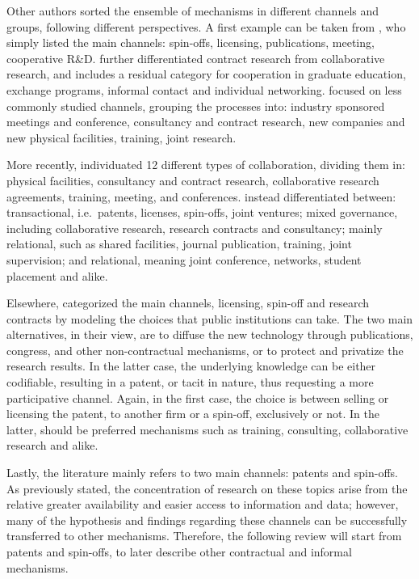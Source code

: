 Other authors sorted the ensemble of mechanisms in different channels and groups, following different perspectives. A first example can be taken from 	\citet{Rogers2001}, who simply listed the main channels: spin-offs, licensing, publications, meeting, cooperative R\&D. \citet{Debackere2005} further differentiated contract research from collaborative research, and includes a residual category for cooperation in graduate education, exchange programs, informal contact and individual networking. \citet{DEste2007} focused on less commonly studied channels, grouping the processes into: industry sponsored meetings and conference, consultancy and contract research, new companies and new physical facilities, training, joint research. 

More recently, \citet{Muscio2013} individuated 12 different types of collaboration, dividing them in: physical facilities, consultancy and contract research, collaborative research agreements, training, meeting, and conferences. \citet{Alexander2013} instead differentiated between: transactional, i.e.\ patents, licenses, spin-offs, joint ventures; mixed governance, including collaborative research, research contracts and consultancy; mainly relational, such as shared facilities, journal publication, training, joint supervision; and relational, meaning joint conference, networks, student placement and alike.

Elsewhere, \citet{Balderi2010} categorized the main channels, licensing, spin-off and research contracts by modeling the choices that public institutions can take. The two main alternatives, in their view, are to diffuse the new technology through publications, congress, and other non-contractual mechanisms, or to protect and privatize the research results. In the latter case, the underlying knowledge can be either codifiable, resulting in a patent, or tacit in nature, thus requesting a more participative channel. Again, in the first case, the choice is between selling or licensing the patent, to another firm or a spin-off, exclusively or not. In the latter, should be preferred mechanisms such as training, consulting, collaborative research and alike. 

Lastly, the literature mainly refers to two main channels: patents and spin-offs. As previously stated, the concentration of research on these topics arise from the relative greater availability and easier access to information and data; however, many of the hypothesis and findings regarding these channels can be successfully transferred to other mechanisms. Therefore, the following review will start from patents and spin-offs, to later describe other contractual and informal mechanisms. 


